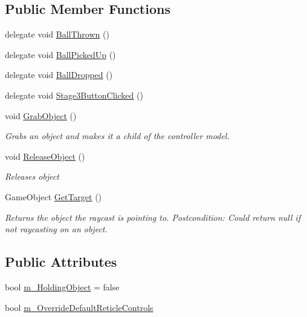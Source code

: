 \subsection*{Public Member Functions}
\begin{DoxyCompactItemize}
\item 
delegate void \mbox{\hyperlink{class_v_r_standard_assets_1_1_utils_1_1_raycaster_v_r_a208df26f1139ba566bd76ab13e654fac}{Ball\+Thrown}} ()
\item 
delegate void \mbox{\hyperlink{class_v_r_standard_assets_1_1_utils_1_1_raycaster_v_r_a85241158337110726e61258a3237752e}{Ball\+Picked\+Up}} ()
\item 
delegate void \mbox{\hyperlink{class_v_r_standard_assets_1_1_utils_1_1_raycaster_v_r_afa0e8c643d924f0f008364e153844e5f}{Ball\+Dropped}} ()
\item 
delegate void \mbox{\hyperlink{class_v_r_standard_assets_1_1_utils_1_1_raycaster_v_r_a68cab6ce8e6920717a4c08bc6f3992d8}{Stage3\+Button\+Clicked}} ()
\item 
void \mbox{\hyperlink{class_v_r_standard_assets_1_1_utils_1_1_raycaster_v_r_a9a87f20c50af01181912243fa8b88b21}{Grab\+Object}} ()
\begin{DoxyCompactList}\small\item\em Grabs an object and makes it a child of the controller model. \end{DoxyCompactList}\item 
void \mbox{\hyperlink{class_v_r_standard_assets_1_1_utils_1_1_raycaster_v_r_ad84bd58bab791d8ae7449eb923bb3153}{Release\+Object}} ()
\begin{DoxyCompactList}\small\item\em Releases object \end{DoxyCompactList}\item 
Game\+Object \mbox{\hyperlink{class_v_r_standard_assets_1_1_utils_1_1_raycaster_v_r_a5e7507b5485b5da01059538a932cafb2}{Get\+Target}} ()
\begin{DoxyCompactList}\small\item\em Returns the object the raycast is pointing to. Postcondition\+: Could return null if not raycasting on an object. \end{DoxyCompactList}\end{DoxyCompactItemize}
\subsection*{Public Attributes}
\begin{DoxyCompactItemize}
\item 
bool \mbox{\hyperlink{class_v_r_standard_assets_1_1_utils_1_1_raycaster_v_r_a729875cefaafc3d00b050d1b65b086f5}{m\+\_\+\+Holding\+Object}} = false
\item 
bool \mbox{\hyperlink{class_v_r_standard_assets_1_1_utils_1_1_raycaster_v_r_ad7f6af5f491c0d3955dcd7c712321f26}{m\+\_\+\+Override\+Default\+Reticle\+Controls}}
\end{DoxyCompactItemize}
